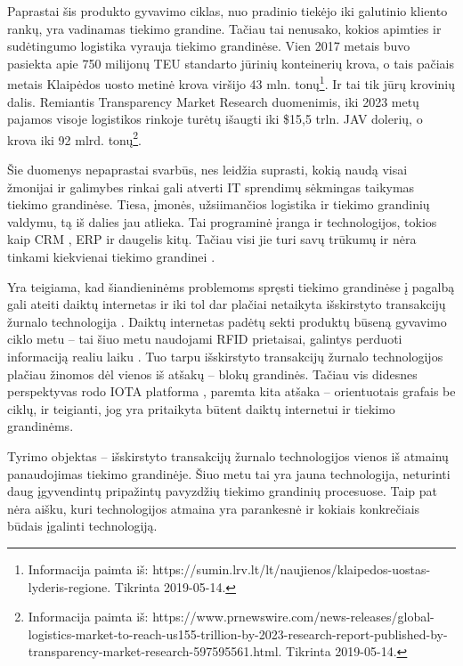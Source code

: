 Paprastai šis produkto gyvavimo ciklas, nuo pradinio tiekėjo iki galutinio kliento rankų, yra vadinamas tiekimo grandine. Tačiau tai nenusako, kokios apimties ir sudėtingumo logistika vyrauja tiekimo grandinėse. Vien 2017 metais buvo pasiekta apie 750 milijonų TEU standarto jūrinių konteinerių krova\footnotemark[\ref{note1}], o tais pačiais metais Klaipėdos uosto metinė krova viršijo 43 mln. tonų\footnote{Informacija paimta iš: https://sumin.lrv.lt/lt/naujienos/klaipedos-uostas-lyderis-regione. Tikrinta 2019-05-14.}. Ir tai tik jūrų krovinių dalis. Remiantis Transparency Market Research duomenimis, iki 2023 metų pajamos visoje logistikos rinkoje turėtų išaugti iki \$15,5 trln. JAV dolerių, o krova iki 92 mlrd. tonų\footnote{Informacija paimta iš: https://www.prnewswire.com/news-releases/global-logistics-market-to-reach-us155-trillion-by-2023-research-report-published-by-transparency-market-research-597595561.html. Tikrinta 2019-05-14.}.

Šie duomenys nepaprastai svarbūs, nes leidžia suprasti, kokią naudą visai žmonijai ir galimybes rinkai gali atverti IT sprendimų sėkmingas taikymas tiekimo grandinėse. Tiesa, įmonės, užsiimančios logistika ir tiekimo grandinių valdymu, tą iš dalies jau atlieka. Tai programinė įranga ir technologijos, tokios kaip CRM \cite{bharati2015current}, ERP \cite{neubert2018collaboration} ir daugelis kitų. Tačiau visi jie turi savų trūkumų ir nėra tinkami kiekvienai tiekimo grandinei \cite{garg2018supply}.

Yra teigiama, kad šiandieninėms problemoms spręsti tiekimo grandinėse į pagalbą gali ateiti daiktų internetas \cite{dweekat2017supply} ir iki tol dar plačiai netaikyta išskirstyto transakcijų žurnalo technologija \cite{abeyratne2016blockchain}. Daiktų internetas padėtų sekti produktų būseną gyvavimo ciklo metu – tai šiuo metu naudojami RFID prietaisai, galintys perduoti informaciją realiu laiku \cite{majeed2017internet}. Tuo tarpu išskirstyto transakcijų žurnalo technologijos plačiau žinomos dėl vienos iš atšakų – blokų grandinės. Tačiau vis didesnes perspektyvas rodo IOTA platforma \cite{popov2016tangle}, paremta kita atšaka – orientuotais grafais be ciklų, ir teigianti, jog yra pritaikyta būtent daiktų internetui ir tiekimo grandinėms. 

Tyrimo objektas – išskirstyto transakcijų žurnalo technologijos vienos iš atmainų panaudojimas tiekimo grandinėje. Šiuo metu tai yra jauna technologija, neturinti daug įgyvendintų pripažintų pavyzdžių tiekimo grandinių procesuose. Taip pat nėra aišku, kuri technologijos atmaina yra parankesnė ir kokiais konkrečiais būdais įgalinti technologiją.

